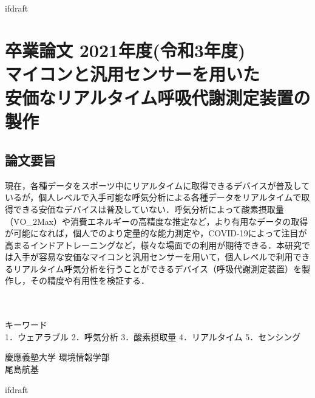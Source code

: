 \expandafter\ifx\csname ifdraft\endcsname\relax
 
\fi

\section*{卒業論文 2021年度(令和3年度)\\マイコンと汎用センサーを用いた\\安価なリアルタイム呼吸代謝測定装置の製作}
\subsection*{論文要旨}
\noindent %

現在，各種データをスポーツ中にリアルタイムに取得できるデバイスが普及しているが，個人レベルで入手可能な呼気分析による各種データをリアルタイムで取得できる安価なデバイスは普及していない．呼気分析によって酸素摂取量（\.{V}O_2Max）や消費エネルギーの高精度な推定など，より有用なデータの取得が可能になれば，個人でのより定量的な能力測定や，COVID-19によって注目が高まるインドアトレーニングなど，様々な場面での利用が期待できる．本研究では入手が容易な安価なマイコンと汎用センサーを用いて，個人レベルで利用できるリアルタイム呼気分析を行うことができるデバイス（呼吸代謝測定装置）を製作し，その精度や有用性を検証する．

\\
\\
キーワード\\
1．ウェアラブル 2．呼気分析 3．酸素摂取量 4．リアルタイム 5．センシング\\
\begin{flushright} %
  慶應義塾大学 環境情報学部\\
  尾島航基
\end{flushright}

\expandafter\ifx\csname ifdraft\endcsname\relax
  
\fi
